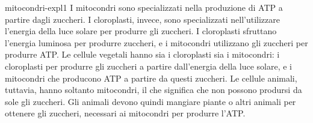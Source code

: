 \documentclass[preview]{standalone}
\begin{document}
\begin{snippet}{mitocondri-expl1}
    I mitocondri sono specializzati nella
    produzione di ATP a partire dagli zuccheri. I cloroplasti, invece, sono specializzati
    nell'utilizzare l'energia della luce solare per produrre gli zuccheri.
    I cloroplasti sfruttano l'energia luminosa per produrre zuccheri, e i mitocondri
    utilizzano gli zuccheri per produrre ATP. Le cellule vegetali hanno sia i cloroplasti sia i
    mitocondri: i cloroplasti per produrre gli zuccheri a partire dall'energia della luce solare, e i
    mitocondri che producono ATP a partire da questi zuccheri. Le cellule animali, tuttavia,
    hanno soltanto mitocondri, il che significa che non possono prodursi da sole gli zuccheri. Gli
    animali devono quindi mangiare piante o altri animali per ottenere gli zuccheri, necessari ai
    mitocondri per produrre l'ATP.
\end{snippet}


\end{document}
